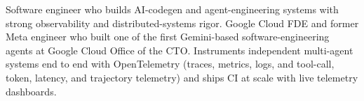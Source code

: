 


Software engineer who builds AI-codegen and agent-engineering systems with strong observability and distributed-systems rigor. Google Cloud FDE and former Meta engineer who built one of the first Gemini-based software-engineering agents at Google Cloud Office of the CTO. Instruments independent multi-agent systems end to end with OpenTelemetry (traces, metrics, logs, and tool-call, token, latency, and trajectory telemetry) and ships CI at scale with live telemetry dashboards.







